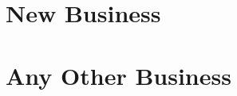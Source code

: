 \documentclass[11pt,hacksoc]{meetingmins}
\begin{document}
\section{New Business}

\section{Any Other Business}

\vspace{1em}
\end{document}

